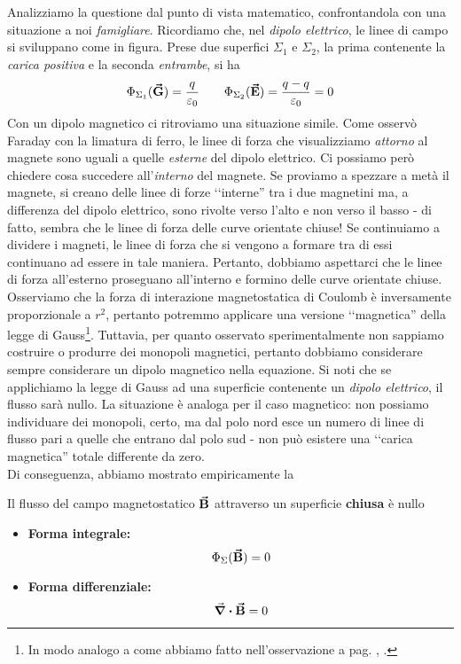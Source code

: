 Analizziamo la questione dal punto di vista matematico, confrontandola con una situazione a noi \textit{famigliare}. Ricordiamo che, nel \textit{dipolo elettrico}, le linee di campo si sviluppano come in figura.
Prese due superfici $\Sigma_1$ e $\Sigma_2$, la prima contenente la \textit{carica positiva} e la seconda \textit{entrambe}, si ha
\begin{equation*}
	\Phi_{\Sigma_1}(\vb*{\va{G}})=\frac{q}{\varepsilon_0}\qquad\Phi_{\Sigma_2}(\vb*{\va{E}})=\frac{q-q}{\varepsilon_0}=0
\end{equation*}
Con un dipolo magnetico ci ritroviamo una situazione simile.
Come osservò Faraday con la limatura di ferro, le linee di forza che visualizziamo \textit{attorno} al magnete sono uguali a quelle \textit{esterne} del dipolo elettrico. Ci possiamo però chiedere cosa succedere all'\textit{interno} del magnete. Se proviamo a spezzare a metà il magnete, si creano delle linee di forze ‘‘interne'' tra i due magnetini ma, a differenza del dipolo elettrico, sono rivolte verso l'alto e non verso il basso - di fatto, sembra che le linee di forza delle curve orientate chiuse!
Se continuiamo a dividere i magneti, le linee di forza che si vengono a formare tra di essi continuano ad essere in tale maniera. Pertanto, dobbiamo aspettarci che le linee di forza all'esterno proseguano all'interno e formino delle curve orientate chiuse.
Osserviamo che la forza di interazione magnetostatica di Coulomb è inversamente proporzionale a $r^2$, pertanto potremmo applicare una versione ‘‘magnetica'' della legge di Gauss\footnote{In modo analogo a come abbiamo fatto nell'osservazione a pag. \pageref{LeggeGaussMoltoGeneralizzata}, .}. Tuttavia, per quanto osservato sperimentalmente non sappiamo costruire o produrre dei monopoli magnetici, pertanto dobbiamo considerare sempre considerare un dipolo magnetico nella equazione.
Si noti che se applichiamo la legge di Gauss ad una superficie contenente un \textit{dipolo elettrico}, il flusso sarà nullo. La situazione è analoga per il caso magnetico: non possiamo individuare dei monopoli, certo, ma dal polo nord esce un numero di linee di flusso pari a quelle che entrano dal polo sud - non può esistere una ‘‘carica magnetica'' totale differente da zero.\\
Di conseguenza, abbiamo mostrato empiricamente la
\begin{theorema}
	Il flusso del campo magnetostatico $\vb*{\va{B}}$ attraverso un superficie \textbf{chiusa} è nullo
	\begin{itemize}
		\item \textbf{Forma integrale:}
		\begin{equation}
			\Phi_\Sigma(\vb*{\va{B}})=0\label{LeggeGaussMagnetismoIntegrale}
		\end{equation}
		\item \textbf{Forma differenziale:}
		\begin{equation}
			\div{\vb*{\va{B}}}=0\label{LeggeGaussMagnetismoDifferenziale}
		\end{equation}
	\end{itemize}
\end{theorema}
